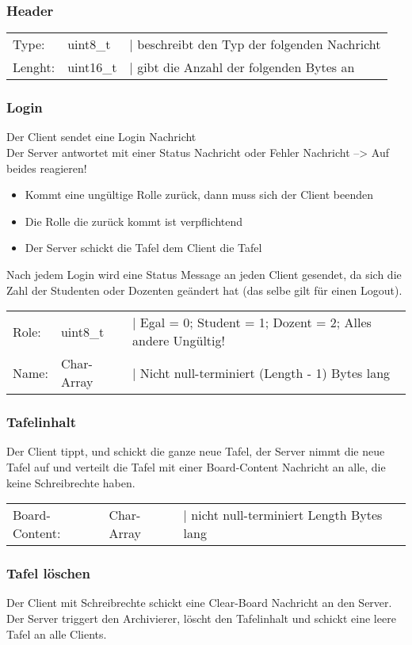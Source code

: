\subsubsection{Header}
\begin{tabular}{lll}
Type: & uint8\_t & | beschreibt den Typ der folgenden Nachricht \\
Lenght: & uint16\_t & | gibt die Anzahl der folgenden Bytes an
\end{tabular}

\subsubsection{Login}
Der Client sendet eine Login Nachricht \\
Der Server antwortet mit einer Status Nachricht oder Fehler Nachricht --> Auf beides reagieren!
\begin{itemize}
	\item Kommt eine ungültige Rolle zurück, dann muss sich der Client beenden
	\item Die Rolle die zurück kommt ist verpflichtend
	\item Der Server schickt die Tafel dem Client die Tafel
\end{itemize}
Nach jedem Login wird eine Status Message an jeden Client gesendet, da sich die Zahl der Studenten
oder Dozenten geändert hat (das selbe gilt für einen Logout).

\begin{tabular}{lll}
Role: & uint8\_t & | Egal = 0; Student =  1; Dozent = 2; Alles andere Ungültig! \\
Name: & Char-Array & | Nicht null-terminiert (Length - 1) Bytes lang
\end{tabular}

\subsubsection{Tafelinhalt}
Der Client tippt, und schickt die ganze neue Tafel, der Server nimmt die neue Tafel auf und verteilt 
die Tafel mit einer Board-Content Nachricht an alle, die keine Schreibrechte haben.

\begin{tabular}{lll}
Board-Content: & Char-Array & | nicht null-terminiert Length Bytes lang
\end{tabular}

\subsubsection{Tafel löschen}
Der Client mit Schreibrechte schickt eine Clear-Board Nachricht an den Server. Der Server triggert 
den Archivierer, löscht den Tafelinhalt und schickt eine leere Tafel an alle Clients. 

